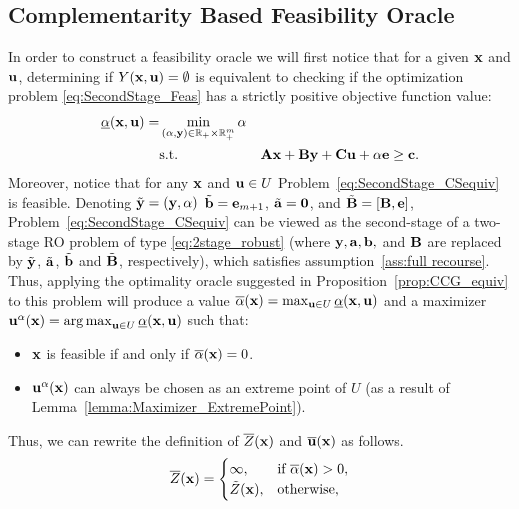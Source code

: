 \documentclass[12pt,x11names]{article}
\theoremstyle{definition}
\newcommand{\real}{\mathbb{R}} %
\newcommand{\bzero}{{\bf 0}}
\newcommand{\bone}{{\bf e}}
\newcommand{\ba}{{\bf a}}
\newcommand{\bb}{{\bf b}}
\newcommand{\bc}{{\bf c}}
\newcommand{\bu}{{\bf u}}
\newcommand{\bx}{{\bf x}}
\newcommand{\by}{{\bf y}}
\newcommand{\bba}{{\bf A}}
\newcommand{\bbb}{{\bf B}}
\newcommand{\bbc}{{\bf C}}
\DeclareMathOperator*{\argmax}{arg\,max}
\begin{document}
\subsection{Complementarity Based Feasibility Oracle}
In order to construct a feasibility oracle we will first notice that for a given $\bx$ and $\bu$, determining if $Y(\bx,\bu)=\emptyset$ is equivalent to checking if the optimization problem \eqref{eq:SecondStage_Feas} has a strictly positive  objective function value:
\begin{equation}\label{eq:SecondStage_Feas}
\begin{aligned}
\underline{\alpha}(\bx,\bu)=&\min_{(\alpha,\by)\in\real_+\times\real^m_+} \alpha\\
&\text{s.t.} &\bba\bx+\bbb\by+\bbc\bu+\alpha \bone\geq \bc. 
\end{aligned}
\end{equation} 
Moreover, notice that for any $\bx$ and $\bu\in U$ Problem~\eqref{eq:SecondStage_CSequiv} is feasible. Denoting $\tilde{\by}=(\by,\alpha)$  $\tilde{\bb}=\bone_{m+1}$, $\tilde{\ba}=\bzero$, and $\tilde{\bbb}=[\bbb,\bone]$, Problem~\eqref{eq:SecondStage_CSequiv} can be viewed as the second-stage of a two-stage RO problem of type \eqref{eq:2stage_robust} (where $\by,\ba,\bb,$ and $\bbb$ are replaced by $\tilde{\by}$, $\tilde{\ba}$, $\tilde{\bb}$ and $\tilde{\bbb}$, respectively), which satisfies assumption~\ref{ass:full recourse}.
Thus, applying the optimality oracle suggested in Proposition~\ref{prop:CCG_equiv} to this problem will produce a value 
$\overline{\alpha}(\bx)=\max_{\bu\in U} \underline{\alpha}(\bx,\bu)$ and a maximizer ${\bu}^\alpha(\bx)=\argmax_{\bu\in U} \underline{\alpha}(\bx,\bu)$ such that:
\begin{itemize}
\item $\bx$ is feasible if and only if $\overline{\alpha}(\bx)=0$.
\item ${\bu}^{\alpha}(\bx)$ can always be chosen as an extreme point of $U$ (as a result of Lemma~\ref{lemma:Maximizer_ExtremePoint}).
\end{itemize}
Thus, we can rewrite the definition of $\overline{Z}(\bx)$ and $\overline{\bu}(\bx)$ as follows.
\begin{equation}\label{eq:RealWorstCase}\overline{Z}(\bx)=\begin{cases}
\infty, & \text{if } \overline{\alpha}(\bx)>0,\\
\tilde{Z}(\bx), & \text{otherwise},
\end{cases}\end{equation} 
\end{document}

